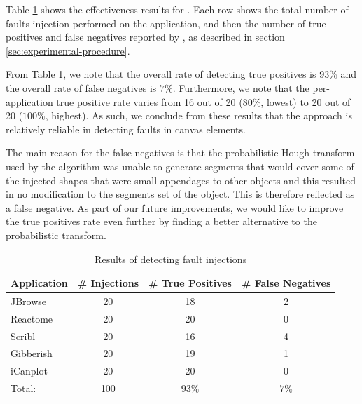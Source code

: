Table \ref{tbl:result-fault-injections} shows the effectiveness results for \tool. 
Each row shows the total number of faults injection performed on the application, and then the number of true positives and false negatives reported by \tool, as described in section \ref{sec:experimental-procedure}.

From Table \ref{tbl:result-fault-injections}, we note that the overall rate of detecting true positives is $93\%$ and the overall rate of false negatives is $7\%$. Furthermore, we note that the per-application true positive rate varies from 16 out of 20 ($80\%$, lowest) to 20 out of 20 ($100\%$, highest). 
As such, we conclude from these results that the approach is relatively reliable in detecting faults in canvas elements. 

The main reason for the false negatives is that the probabilistic Hough transform used by the algorithm was unable to generate segments that would cover some of the injected shapes that were small appendages to other objects and this resulted in no modification to the segments set of the object. This is therefore reflected as a false negative. As part of our future improvements, we would like to improve the true positives rate even further by finding a better alternative to the probabilistic transform.

\begin{table}[b]
\setlength{\tabcolsep}{6pt}
\renewcommand{\arraystretch}{0.9}
\centering
\caption{Results of detecting fault injections}
\begin{tabular}{lccc}
\toprule
\textbf{Application} &  \textbf{\# Injections}  &  \textbf{\# True Positives} & \textbf{\# False Negatives} \\
\midrule
JBrowse~\cite{eval_app_jbrowse}      & 20 &  18  &  2 \\
Reactome~\cite{eval_app_reactome}    & 20 &  20  &  0 \\
Scribl~\cite{eval_app_scribl}        & 20 &  16  &  4 \\
Gibberish~\cite{eval_app_gibberish}  & 20 &  19  &  1  \\
iCanplot~\cite{eval_app_icanplot}    & 20 &  20  &  0 \\
\midrule
Total:  & 100   &  $93 \%$ &  $7 \%$ \\

\bottomrule
\end{tabular}
\label{tbl:result-fault-injections}
\end{table}

